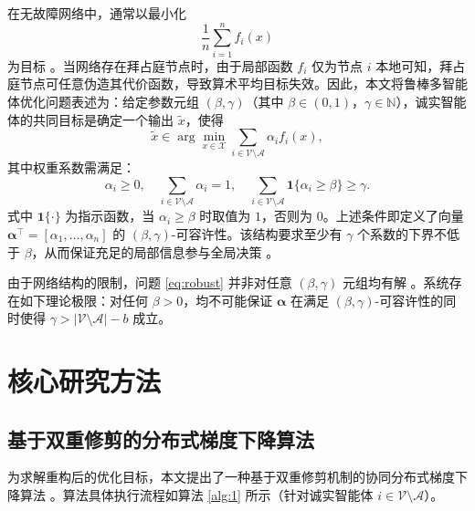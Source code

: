 \documentclass[12pt,hyperref,a4paper,UTF8]{ctexart}
\numberwithin{equation}{section}
\numberwithin{figure}{section}
\numberwithin{table}{section}
\begin{document}
在无故障网络中，通常以最小化 
\begin{equation}
\frac{1}{n}\sum_{i=1}^{n} f_i(x)
\end{equation}
为目标 \cite{tsianos2012, nedic2015}。当网络存在拜占庭节点时，由于局部函数 $f_i$ 仅为节点 $i$ 本地可知，拜占庭节点可任意伪造其代价函数，导致算术平均目标失效。因此，本文将鲁棒多智能体优化问题表述为：给定参数元组 $(\beta,\gamma)$（其中 $\beta\in(0,1)$，$\gamma\in\mathbb{N}$），诚实智能体的共同目标是确定一个输出 $\widetilde{x}$，使得
\begin{equation}
    \widetilde{x}\in\arg \min_{x\in\mathcal{X}} \sum_{i\in\mathcal{V}\setminus\mathcal{A}} \alpha_i f_i(x),
    \label{eq:robust}
\end{equation}
其中权重系数需满足：
\begin{equation}
    \alpha_i \ge 0,\quad \sum_{i\in\mathcal{V}\setminus\mathcal{A}} \alpha_i = 1,\quad
    \sum_{i\in\mathcal{V}\setminus\mathcal{A}} \mathbf{1}\{\alpha_i \ge \beta\} \ge \gamma .
    \label{eq:admissibility_condition}
\end{equation}
式中 $\mathbf{1}\{\cdot\}$ 为指示函数，当 $\alpha_i\ge\beta$ 时取值为 $1$，否则为 $0$。上述条件即定义了向量 $\boldsymbol{\alpha}^\top = [\alpha_1,\ldots,\alpha_n]$ 的 $(\beta,\gamma)$-可容许性。该结构要求至少有 $\gamma$ 个系数的下界不低于 $\beta$，从而保证充足的局部信息参与全局决策 \cite{charikar2017}。

由于网络结构的限制，问题 \eqref{eq:robust} 并非对任意 $(\beta,\gamma)$ 元组均有解 \cite{su2016limits}。系统存在如下理论极限：对任何 $\beta>0$，均不可能保证 $\boldsymbol{\alpha}$ 在满足 $(\beta,\gamma)$-可容许性的同时使得 $\gamma > |\mathcal{V}\setminus\mathcal{A}|-b$ 成立。

\section{核心研究方法}

\subsection{基于双重修剪的分布式梯度下降算法}
\quad \quad  为求解重构后的优化目标，本文提出了一种基于双重修剪机制的协同分布式梯度下降算法 \cite{su2021byzantine}。算法具体执行流程如算法 \ref{alg:1} 所示（针对诚实智能体 $i\in\mathcal{V}\setminus\mathcal{A}$）。
\end{document}
